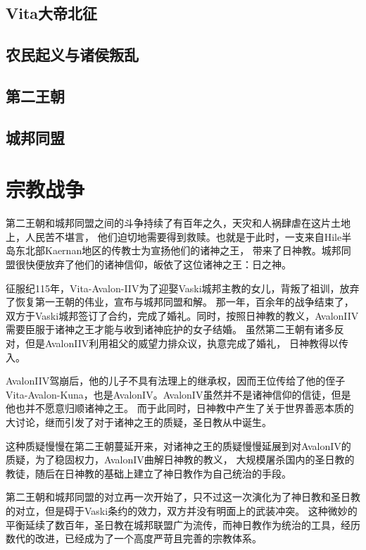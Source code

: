 \documentclass[UTF8,12pt]{ctexbook}
\begin{document}
    \chapter{Vita大帝北征}

    \chapter{农民起义与诸侯叛乱}

    \chapter{第二王朝}

    \chapter{城邦同盟}


\part{宗教战争}

        第二王朝和城邦同盟之间的斗争持续了有百年之久，天灾和人祸肆虐在这片土地上，人民苦不堪言，
        他们迫切地需要得到救赎。也就是于此时，一支来自Hile半岛东北部Kaernan地区的传教士为宣扬他们的诸神之王，
        带来了日神教。城邦同盟很快便放弃了他们的诸神信仰，皈依了这位诸神之王：日之神。

        征服纪115年，Vita-Avalon-IIV为了迎娶Vaski城邦主教的女儿，背叛了祖训，放弃了恢复第一王朝的伟业，宣布与城邦同盟和解。
        那一年，百余年的战争结束了，双方于Vaski城邦签订了合约，完成了婚礼。同时，按照日神教的教义，AvalonIIV需要臣服于诸神之王才能与收到诸神庇护的女子结婚。
        虽然第二王朝有诸多反对，但是AvalonIIV利用祖父的威望力排众议，执意完成了婚礼，
        日神教得以传入。

        AvalonIIV驾崩后，他的儿子不具有法理上的继承权，因而王位传给了他的侄子Vita-Avalon-Kuna，也是AvalonIV。AvalonIV虽然并不是诸神信仰的信徒，但是他也并不愿意归顺诸神之王。
        而于此同时，日神教中产生了关于世界善恶本质的大讨论，继而引发了对于诸神之王的质疑，圣日教从中诞生。

        这种质疑慢慢在第二王朝蔓延开来，对诸神之王的质疑慢慢延展到对AvalonIV的质疑，为了稳固权力，AvalonIV曲解日神教的教义，
        大规模屠杀国内的圣日教的教徒，随后在日神教的基础上建立了神日教作为自己统治的手段。

        第二王朝和城邦同盟的对立再一次开始了，只不过这一次演化为了神日教和圣日教的对立，但是碍于Vaski条约的效力，双方并没有明面上的武装冲突。
        这种微妙的平衡延续了数百年，圣日教在城邦联盟广为流传，而神日教作为统治的工具，经历数代的改进，已经成为了一个高度严苛且完善的宗教体系。
\end{document}
